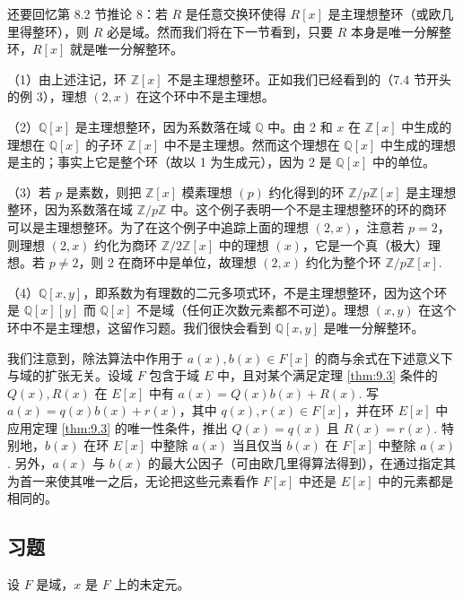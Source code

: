 还要回忆第 8.2 节推论 8：若 \(R\) 是任意交换环使得 \(R[x]\) 是主理想整环（或欧几里得整环），则 \(R\) 必是域。然而我们将在下一节看到，只要 \(R\) 本身是唯一分解整环，\(R[x]\) 就是唯一分解整环。

\begin{example}
（1）由上述注记，环 \(\mathbb{Z}[x]\) 不是主理想整环。正如我们已经看到的（7.4 节开头的例 3），理想 \((2, x)\) 在这个环中不是主理想。

（2）\(\mathbb{Q}[x]\) 是主理想整环，因为系数落在域 \(\mathbb{Q}\) 中。由 2 和 \(x\) 在 \(\mathbb{Z}[x]\) 中生成的理想在 \(\mathbb{Q}[x]\) 的子环 \(\mathbb{Z}[x]\) 中不是主理想。然而这个理想在 \(\mathbb{Q}[x]\) 中生成的理想是主的；事实上它是整个环（故以 1 为生成元），因为 2 是 \(\mathbb{Q}[x]\) 中的单位。

（3）若 \(p\) 是素数，则把 \(\mathbb{Z}[x]\) 模素理想 \((p)\) 约化得到的环 \(\mathbb{Z}/p\mathbb{Z}[x]\) 是主理想整环，因为系数落在域 \(\mathbb{Z}/p\mathbb{Z}\) 中。这个例子表明一个不是主理想整环的环的商环可以是主理想整环。为了在这个例子中追踪上面的理想 \((2, x)\)，注意若 \(p = 2\)，则理想 \((2, x)\) 约化为商环 \(\mathbb{Z}/2\mathbb{Z}[x]\) 中的理想 \((x)\)，它是一个真（极大）理想。若 \(p \neq 2\)，则 2 在商环中是单位，故理想 \((2, x)\) 约化为整个环 \(\mathbb{Z}/p\mathbb{Z}[x]\).

（4）\(\mathbb{Q}[x, y]\)，即系数为有理数的二元多项式环，不是主理想整环，因为这个环是 \(\mathbb{Q}[x][y]\) 而 \(\mathbb{Q}[x]\) 不是域（任何正次数元素都不可逆）。理想 \((x, y)\) 在这个环中不是主理想，这留作习题。我们很快会看到 \(\mathbb{Q}[x, y]\) 是唯一分解整环。
\end{example}

我们注意到，除法算法中作用于 \(a(x), b(x) \in F[x]\) 的商与余式在下述意义下与域的扩张无关。设域 \(F\) 包含于域 \(E\) 中，且对某个满足定理 \ref{thm:9.3} 条件的 \(Q(x), R(x)\) 在 \(E[x]\) 中有 \(a(x) = Q(x)b(x) + R(x)\). 写 \(a(x) = q(x)b(x) + r(x)\)，其中 \(q(x), r(x) \in F[x]\)，并在环 \(E[x]\) 中应用定理 \ref{thm:9.3} 的唯一性条件，推出 \(Q(x) = q(x)\) 且 \(R(x) = r(x)\). 特别地，\(b(x)\) 在环 \(E[x]\) 中整除 \(a(x)\) 当且仅当 \(b(x)\) 在 \(F[x]\) 中整除 \(a(x)\). 另外，\(a(x)\) 与 \(b(x)\) 的最大公因子（可由欧几里得算法得到），在通过指定其为首一来使其唯一之后，无论把这些元素看作 \(F[x]\) 中还是 \(E[x]\) 中的元素都是相同的。

\subsection*{习题}

\noindent 设 \(F\) 是域，\(x\) 是 \(F\) 上的未定元。

